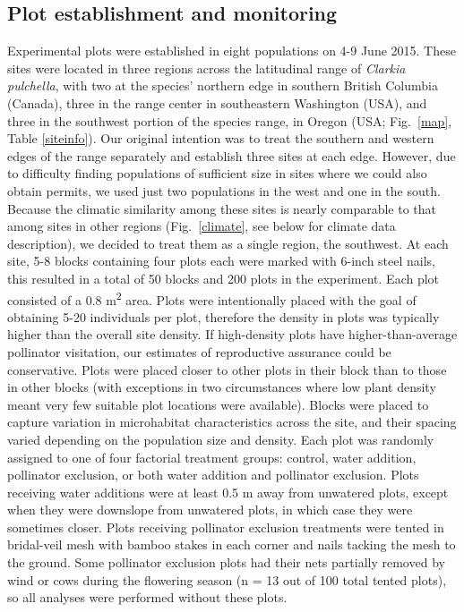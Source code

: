 \documentclass{article}
\begin{document}
\subsection*{Plot establishment and monitoring}

Experimental plots were established in eight populations on 4-9 June 2015. These sites were located in three regions across the latitudinal range of \textit{Clarkia pulchella}, with two at the species' northern edge in southern British Columbia (Canada), three in the range center in southeastern Washington (USA), and three in the southwest portion of the species range, in Oregon (USA; Fig.\ \ref{map}, Table \ref{siteinfo}). Our original intention was to treat the southern and western edges of the range separately and establish three sites at each edge. However, due to difficulty finding populations of sufficient size in sites where we could also obtain permits, we used just two populations in the west and one in the south. Because the climatic similarity among these sites is nearly comparable to that among sites in other regions (Fig.\ \ref{climate}, see below for climate data description), we decided to treat them as a single region, the southwest. At each site, 5-8 blocks containing four plots each were marked with 6-inch steel nails, this resulted in a total of 50 blocks and 200 plots in the experiment. Each plot consisted of a 0.8 m\textsuperscript{2} area. Plots were intentionally placed with the goal of obtaining 5-20 individuals per plot, therefore the density in plots was typically higher than the overall site density. If high-density plots have higher-than-average pollinator visitation, our estimates of reproductive assurance could be conservative. Plots were placed closer to other plots in their block than to those in other blocks (with exceptions in two circumstances where low plant density meant very few suitable plot locations were available). Blocks were placed to capture variation in microhabitat characteristics across the site, and their spacing varied depending on the population size and density. Each plot was randomly assigned to one of four factorial treatment groups: control, water addition, pollinator exclusion, or both water addition and pollinator exclusion. Plots receiving water additions were at least 0.5 m away from unwatered plots, except when they were downslope from unwatered plots, in which case they were sometimes closer. Plots receiving pollinator exclusion treatments were tented in bridal-veil mesh with bamboo stakes in each corner and nails tacking the mesh to the ground. Some pollinator exclusion plots had their nets partially removed by wind or cows during the flowering season (n = 13 out of 100 total tented plots), so all analyses were performed without these plots. 
\end{document}
